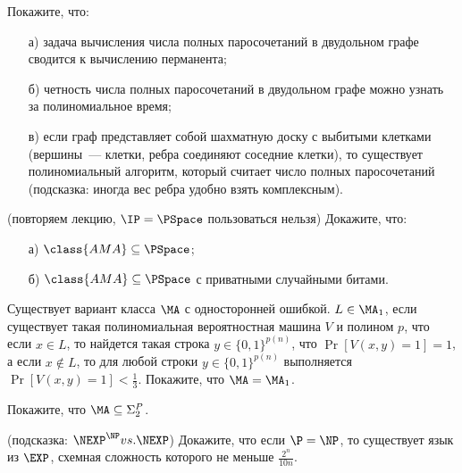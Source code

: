 
\begin{task}
    Покажите, что:
    \begin{enumerate}[topsep = 0pt, itemsep = -1ex]
        \item [а)] задача вычисления числа полных паросочетаний в двудольном графе
            сводится к вычислению перманента;
        \item [б)] четность числа полных паросочетаний в двудольном графе можно
            узнать за полиномиальное время;
        \item [в)] если граф представляет собой шахматную доску с выбитыми клетками
            (вершины~--- клетки, ребра соединяют соседние клетки), то существует
            полиномиальный алгоритм, который считает число полных паросочетаний
            (подсказка: иногда вес ребра удобно взять комплексным).
    \end{enumerate}    
\end{task}

\begin{task}(повторяем лекцию, $\IP = \PSpace$ пользоваться нельзя)
    Докажите, что:
        \begin{enumerate}[topsep = 0pt, itemsep = -1ex]
        \item [а)] $\class{AMA} \subseteq \PSpace$;
        \item [б)] $\class{AMA} \subseteq \PSpace$ с приватными случайными битами.
    \end{enumerate}
\end{task}

\begin{task}
    Существует вариант класса $\MA$ с односторонней ошибкой. $L \in \MA_1$, если существует такая полиномиальная вероятностная
    машина $V$ и полином $p$, что если $x \in L$, то найдется такая строка $y \in \{0, 1\}^{p(n)}$, что $\Pr[V(x, y) = 1] = 1$, а
    если $x \notin L$, то для любой строки $y \in \{0, 1\}^{p(n)}$ выполняется $\Pr[V(x, y) = 1] < \frac{1}{3}$. Покажите, что
    $\MA = \MA_1$.
\end{task}

\begin{task}
    Покажите, что $\MA \subseteq \Sigma_2^P$.
\end{task}


\breakline

\begin{ptask}{26}(подсказка: $\NEXP^{\NP} vs. \NEXP$)
    Докажите, что если $\P = \NP$, то существует язык из $\EXP$, схемная сложность которого не меньше $\frac{2^n}{10 n}$.
\end{ptask}

